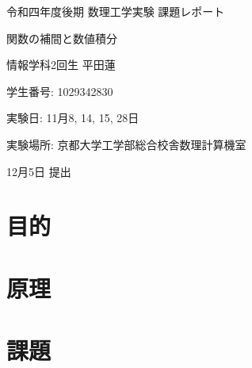 \documentclass[a4j, titlepage]{jsarticle}
\numberwithin{equation}{section}
\begin{document}
\begin{titlepage}
    \begin{center}
        {\Large 令和四年度後期 数理工学実験 課題レポート}

        \vspace*{180truept}

        {\Huge 関数の補間と数値積分}

        \vspace{160truept}

        {\Large 情報学科2回生 平田蓮}

        \vspace{10truept}

        {\large 学生番号: 1029342830}

        \vspace{60truept}

        {\large 実験日: 11月8, 14, 15, 28日}

        \vspace{10truept}

        {\large 実験場所: 京都大学工学部総合校舎数理計算機室}

        \vspace{60truept}

        {\large 12月5日 提出}
    \end{center}
\end{titlepage}

\tableofcontents
\clearpage

\section{目的}
    

\section{原理}
    

\section{課題}
    

\newpage
{}
\begin{thebibliography}{99}
\end{thebibliography}
\end{document}
